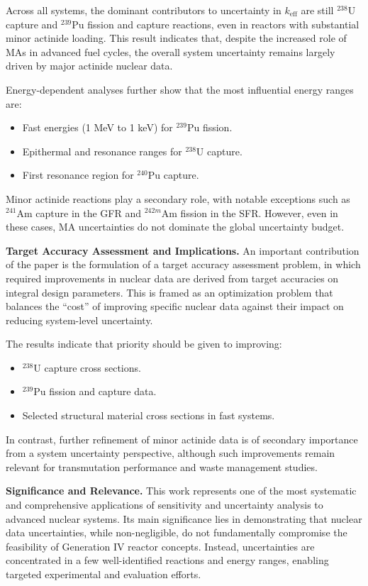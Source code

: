 Across all systems, the dominant contributors to uncertainty in $k_{\text{eff}}$ are still $^{238}$U capture and $^{239}$Pu 
fission and capture reactions, even in reactors with substantial minor actinide loading. This result indicates that, despite the 
increased role of MAs in advanced fuel cycles, the overall system uncertainty remains largely driven by major actinide nuclear data.

Energy-dependent analyses further show that the most influential energy ranges are:
\begin{itemize}
    \item Fast energies (1 MeV to 1 keV) for $^{239}$Pu fission.
    \item Epithermal and resonance ranges for $^{238}$U capture.
    \item First resonance region for $^{240}$Pu capture.
\end{itemize}

Minor actinide reactions play a secondary role, with notable exceptions such as $^{241}$Am capture in the GFR and $^{242m}$Am 
fission in the SFR. However, even in these cases, MA uncertainties do not dominate the global uncertainty budget.

\textbf{Target Accuracy Assessment and Implications.}  
An important contribution of the paper is the formulation of a target accuracy assessment problem, in which required 
improvements in nuclear data are derived from target accuracies on integral design parameters. This is framed as an 
optimization problem that balances the ``cost'' of improving specific nuclear data against their impact on reducing 
system-level uncertainty.

The results indicate that priority should be given to improving:
\begin{itemize}
    \item $^{238}$U capture cross sections.
    \item $^{239}$Pu fission and capture data.
    \item Selected structural material cross sections in fast systems.
\end{itemize}

In contrast, further refinement of minor actinide data is of secondary importance from a system uncertainty perspective, 
although such improvements remain relevant for transmutation performance and waste management studies.

\textbf{Significance and Relevance.}  
This work represents one of the most systematic and comprehensive applications of sensitivity and uncertainty analysis to 
advanced nuclear systems. Its main significance lies in demonstrating that nuclear data uncertainties, while non-negligible, 
do not fundamentally compromise the feasibility of Generation IV reactor concepts. Instead, uncertainties are concentrated in a 
few well-identified reactions and energy ranges, enabling targeted experimental and evaluation efforts.


